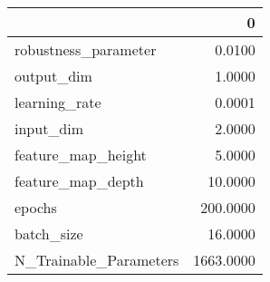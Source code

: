 \begin{tabular}{lr}
\toprule
{} &          0 \\
\midrule
robustness\_parameter   &     0.0100 \\
output\_dim             &     1.0000 \\
learning\_rate          &     0.0001 \\
input\_dim              &     2.0000 \\
feature\_map\_height     &     5.0000 \\
feature\_map\_depth      &    10.0000 \\
epochs                 &   200.0000 \\
batch\_size             &    16.0000 \\
N\_Trainable\_Parameters &  1663.0000 \\
\bottomrule
\end{tabular}
